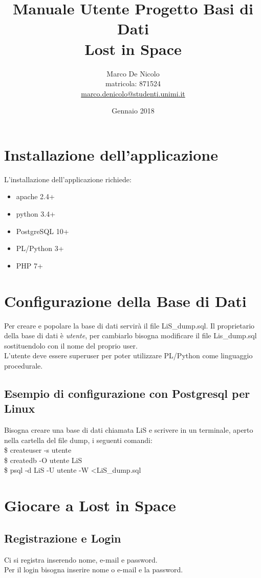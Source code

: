 \documentclass[11pt]{article}
\title{Manuale Utente Progetto Basi di Dati\\Lost in Space}
\author{Marco De Nicolo\\ matricola: 871524\\ \url{marco.denicolo@studenti.unimi.it}}
\date{Gennaio 2018}
\begin{document}
\maketitle
\newpage
\section{Installazione dell'applicazione}
L'installazione dell'applicazione richiede:
\begin{itemize}
\item apache 2.4+
\item python 3.4+
\item PostgreSQL 10+
\item PL/Python 3+
\item PHP 7+
\end{itemize}
\section{Configurazione della Base di Dati}
Per creare e popolare la base di dati servirà il file LiS\_dump.sql.
Il proprietario della base di dati è \textit {utente}, per cambiarlo bisogna modificare il file Lis\_dump.sql sostituendolo con il nome del proprio user.\\
L'utente deve essere superuser per poter utilizzare PL/Python come linguaggio procedurale.
\subsection{Esempio di configurazione con Postgresql per Linux}
Bisogna creare una base di dati chiamata LiS e scrivere in un terminale, aperto nella cartella del file dump, i seguenti comandi:\\
\$ createuser -s utente\\
\$ createdb -O utente LiS\\
\$ psql -d LiS -U utente -W \textless  LiS\_dump.sql\\
\section{Giocare a Lost in Space}
\subsection{Registrazione e Login}
Ci si registra inserendo nome, e-mail e password.\\
Per il login bisogna inserire nome o e-mail e la password.\\
\newline
\begin{center}
\end{center}
\end{document}
